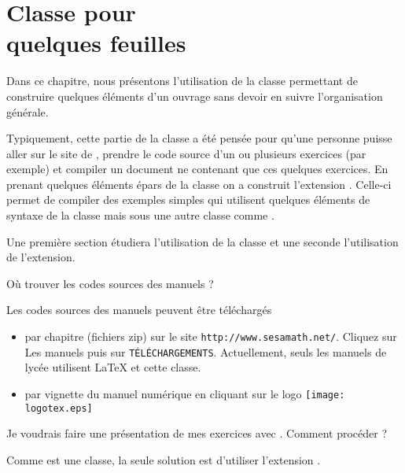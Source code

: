 \documentclass[nocrop]{sesamanuel}
\begin{document}
\chapter{Classe pour\\ quelques feuilles}\label{chClsPourQQFeuilles}
\label{chap-classe-pour-quelques-feuilles}
\begin{prerequis}
  Dans ce chapitre, nous présentons l'utilisation de la classe
  permettant de construire quelques éléments d'un ouvrage sans devoir
  en suivre l'organisation générale.

  Typiquement, cette partie de la classe a été pensée pour qu'une
  personne puisse aller sur le site de \Logosesa{}, prendre le code
  source d'un ou plusieurs exercices (par exemple) et compiler un
  document ne contenant que ces quelques exercices.
\vfill \columnbreak
  En prenant quelques éléments épars de la classe on a construit
  l'extension . Celle-ci permet de compiler des
  exemples simples qui utilisent quelques éléments de syntaxe de la
  classe  mais sous une autre classe comme .

  Une première section étudiera l'utilisation de la classe et une
  seconde l'utilisation de l'extension.
\end{prerequis}

\begin{autoeval}
  \begin{multicols}{2}
    \begin{exercice}
      Où trouver les codes sources des manuels ?
    \end{exercice}
    \begin{corrige}
      Les codes sources des manuels peuvent être téléchargés 
\begin{itemize}
 \item 
      par chapitre (fichiers zip) sur le site
      \texttt{http://www.sesamath.net/}. Cliquez sur Les manuels puis sur
      \texttt{TÉLÉCHARGEMENTS}. Actuellement, seuls les manuels de lycée
      utilisent \LaTeX{} et cette classe.
\item par vignette du manuel numérique en cliquant sur le logo \texttt{[image: logotex.eps]}
\end{itemize}

    \end{corrige}
\vfill \columnbreak
    \begin{exercice}
      Je voudrais faire une présentation de mes exercices avec
      . Comment procéder ?
    \end{exercice}
    \begin{corrige}
      Comme  est une classe, la seule solution est
      d'utiliser l'extension .
    \end{corrige}
  \end{multicols}
\end{autoeval}
\end{document}
